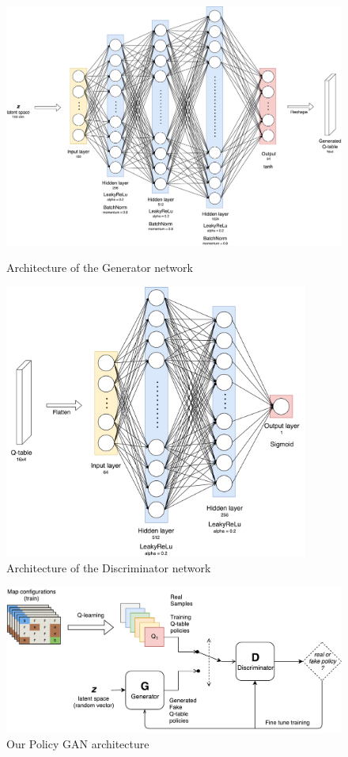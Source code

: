 \begin{figure}
\centering
\includegraphics[width=15cm]{Figures/Generator}
\caption{Architecture of the Generator network}
\label{fig:Generator}

\includegraphics[width=10cm]{Figures/Discriminator}
\caption{Architecture of the Discriminator network}
\label{fig:Discriminator}
\end{figure}


\begin{figure}
\centering
\includegraphics[width=15cm]{Figures/PolicyGAN}
\caption{Our Policy GAN architecture}
\label{fig:PolicyGAN}
\end{figure}

